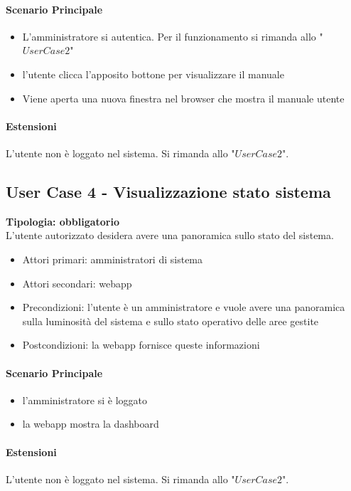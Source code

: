 \documentclass[12pt]{article}
\begin{document}
\paragraph{Scenario Principale}
\begin{itemize}
	\item L'amministratore si autentica. Per il funzionamento si rimanda allo "$User Case 2$"
	\item l'utente clicca l'apposito bottone per visualizzare il manuale
	\item Viene aperta una nuova finestra nel browser che mostra il manuale utente
\end{itemize}

\paragraph{Estensioni} L'utente non è loggato nel sistema. Si rimanda allo "$User Case 2$".

\subsection{User Case 4 - Visualizzazione stato sistema}
\textbf{Tipologia: obbligatorio} \\
L'utente autorizzato desidera avere una panoramica sullo stato del sistema.
\begin{itemize}
	\item Attori primari: amministratori di sistema
	\item Attori secondari: webapp
	\item Precondizioni: l'utente è un amministratore e vuole avere una panoramica sulla luminosità del sistema e sullo stato operativo delle aree gestite
	\item Postcondizioni: la webapp fornisce queste informazioni
\end{itemize}
\paragraph{Scenario Principale}
\begin{itemize}
	\item l'amministratore si è loggato
	\item la webapp mostra la dashboard
\end{itemize}

\paragraph{Estensioni} L'utente non è loggato nel sistema. Si rimanda allo "$User Case 2$".
\end{document}
